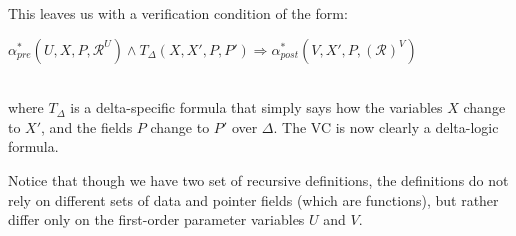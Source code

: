 This leaves us with a verification condition of the form:\\
\centerline{ $\alpha_{\textit{pre}}^*(U, X, P, \mathcal{R}^U) \wedge 
T_\Delta(X, X', P, P') \Rightarrow \alpha_{\textit{post}}^*(V, X', P, \mathcal{(R)}^V)$}\\
where $T_\Delta$ is a
delta-specific formula that simply says how the variables $X$ change to $X'$, and the fields $P$ change to $P'$ over $\Delta$.
The VC is now clearly a delta-logic formula.

Notice that though we have two set of recursive definitions, the definitions do not rely on different sets of
data and pointer fields (which are functions), but rather differ only on the first-order parameter variables $U$ 
and $V$. 

%
%
